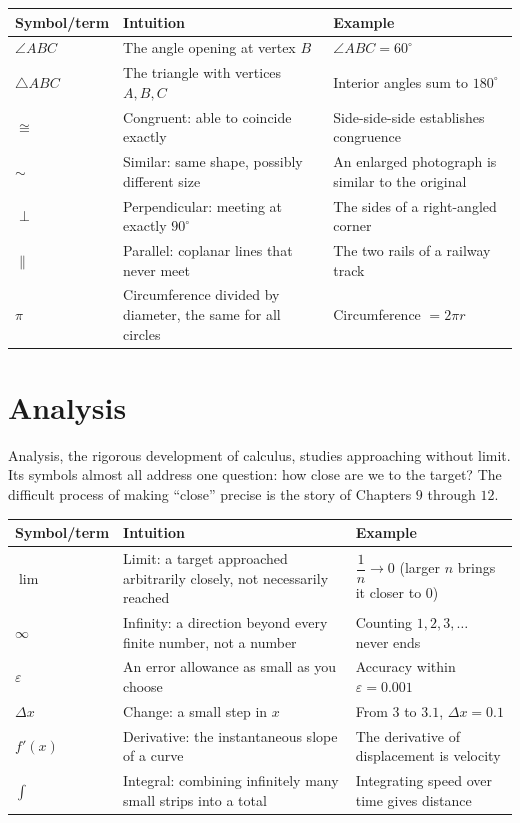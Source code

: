 \begin{center}
\begin{tabular}{lp{4.8cm}p{5.4cm}}
\toprule
Symbol/term & Intuition & Example \\
\midrule
$\angle ABC$ & The angle opening at vertex $B$ & $\angle ABC=60^\circ$ \\
$\triangle ABC$ & The triangle with vertices $A,B,C$ & Interior angles sum to $180^\circ$ \\
$\cong$ & Congruent: able to coincide exactly & Side-side-side establishes congruence \\
$\sim$ & Similar: same shape, possibly different size & An enlarged photograph is similar to the original \\
$\perp$ & Perpendicular: meeting at exactly $90^\circ$ & The sides of a right-angled corner \\
$\parallel$ & Parallel: coplanar lines that never meet & The two rails of a railway track \\
$\pi$ & Circumference divided by diameter, the same for all circles & Circumference $=2\pi r$ \\
\bottomrule
\end{tabular}
\end{center}

\section{Analysis}

Analysis, the rigorous development of calculus, studies approaching without limit. Its symbols almost all address one question: how close are we to the target? The difficult process of making ``close'' precise is the story of Chapters $9$ through $12$.

\begin{center}
\begin{tabular}{lp{4.8cm}p{5.4cm}}
\toprule
Symbol/term & Intuition & Example \\
\midrule
$\lim$ & Limit: a target approached arbitrarily closely, not necessarily reached & $\dfrac{1}{n}\to 0$ (larger $n$ brings it closer to $0$) \\
$\infty$ & Infinity: a direction beyond every finite number, not a number & Counting $1,2,3,\dots$ never ends \\
$\varepsilon$ & An error allowance as small as you choose & Accuracy within $\varepsilon=0.001$ \\
$\Delta x$ & Change: a small step in $x$ & From $3$ to $3.1$, $\Delta x=0.1$ \\
$f'(x)$ & Derivative: the instantaneous slope of a curve & The derivative of displacement is velocity \\
$\int$ & Integral: combining infinitely many small strips into a total & Integrating speed over time gives distance \\
\bottomrule
\end{tabular}
\end{center}

